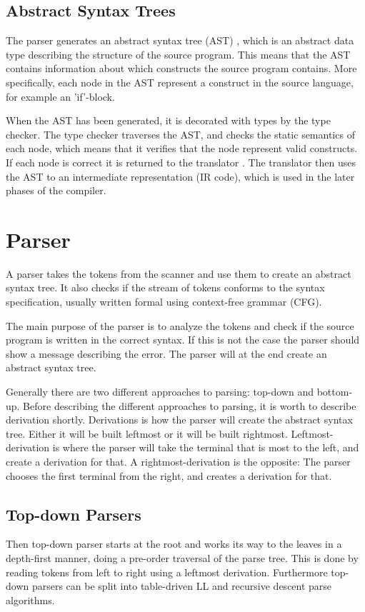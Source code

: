 \subsection{Abstract Syntax Trees}
The parser generates an abstract syntax tree (AST) \citep{CraftingACompiler}, which is an abstract data type describing the structure of the source program. This means that the AST contains information about which constructs the source program contains. More specifically, each node in the AST represent a construct in the source language, for example an 'if'-block.

When the AST has been generated, it is decorated with types by the type checker. The type checker traverses the AST, and checks the static semantics of each node, which means that it verifies that the node represent valid constructs. If each node is correct it is returned to the translator \citep{CraftingACompiler}. The translator then uses the AST to an intermediate representation (IR code), which is used in the later phases of the compiler.

\section{Parser}
A parser takes the tokens from the scanner and use them to create an abstract syntax tree. It also checks if the stream of tokens conforms to the syntax specification, usually written formal using context-free grammar (CFG).

The main purpose of the parser is to analyze the tokens and check if the source program is written in the correct syntax. If this is not the case the parser should show a message describing the error. The parser will at the end create an abstract syntax tree. 

Generally there are two different approaches to parsing: top-down and bottom-up. Before describing the different approaches to parsing, it is worth to describe derivation shortly. Derivations is how the parser will create the abstract syntax tree.
Either it will be built leftmost or it will be built rightmost. Leftmost-derivation is where the parser will take the terminal that is most to the left, and create a derivation for that. A rightmost-derivation is the opposite: The parser chooses the first terminal from the right, and creates a derivation for that.

\subsection{Top-down Parsers}
Then top-down parser starts at the root and works its way to the leaves in a depth-first manner, doing a pre-order traversal of the parse tree. This is done by reading tokens from left to right using a leftmost derivation. Furthermore top-down parsers can be split into table-driven LL and recursive descent parse algorithms.

